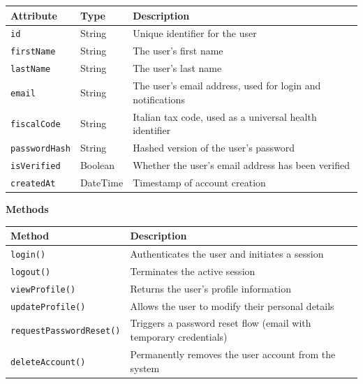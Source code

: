 \documentclass[12pt, a4paper]{article}
\begin{document}
\begin{center}
\small
\renewcommand{\arraystretch}{1.35}
\begin{tabularx}{\textwidth}{|>{\raggedright\arraybackslash}p{3.4cm}|>{\raggedright\arraybackslash}p{3.3cm}|Y|}
\hline
{}
\textbf{Attribute} & \textbf{Type} & \textbf{Description} \\ \hline
\texttt{id} & String & Unique identifier for the user \\ \hline
\texttt{firstName} & String & The user's first name \\ \hline
\texttt{lastName} & String & The user's last name \\ \hline
\texttt{email} & String & The user's email address, used for login and notifications \\ \hline
\texttt{fiscalCode} & String & Italian tax code, used as a universal health identifier \\ \hline
\texttt{passwordHash} & String & Hashed version of the user's password \\ \hline
\texttt{isVerified} & Boolean & Whether the user's email address has been verified \\ \hline
\texttt{createdAt} & DateTime & Timestamp of account creation \\ \hline
\end{tabularx}
\end{center}

\textbf{Methods}

\begin{center}
\small
\renewcommand{\arraystretch}{1.35}
\begin{tabularx}{\textwidth}{|M|Y|}
\hline
{}
\textbf{Method} & \textbf{Description} \\ \hline
\texttt{login()} & Authenticates the user and initiates a session \\ \hline
\texttt{logout()} & Terminates the active session \\ \hline
\texttt{viewProfile()} & Returns the user's profile information \\ \hline
\texttt{updateProfile()} & Allows the user to modify their personal details \\ \hline
\texttt{requestPasswordReset()} & Triggers a password reset flow (email with temporary credentials) \\ \hline
\texttt{deleteAccount()} & Permanently removes the user account from the system \\ \hline
\end{tabularx}
\end{center}
\end{document}
